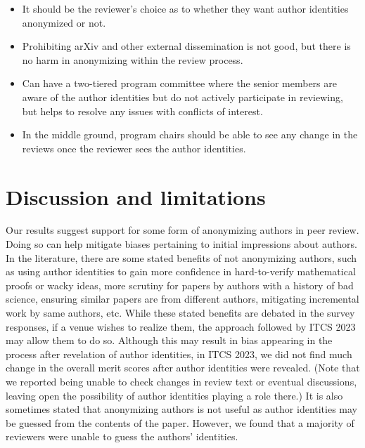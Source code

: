 \documentclass{article}
\begin{document}
{\begin{itemize}
\begin{itemize}
    \item It should be the reviewer's choice as to whether they want author identities anonymized or not.
        
    \item Prohibiting arXiv and other external dissemination is not good, but there is no harm in anonymizing within the review process.

    \item Can have a two-tiered program committee where the senior members are aware of the author identities but do not actively participate in reviewing, but helps to resolve any issues with conflicts of interest.
        
    \item In the middle ground, program chairs should be able to see any change in the reviews once the reviewer sees the author identities.
\end{itemize}

\end{itemize}
}

\section{Discussion and limitations}
Our results suggest support for some form of anonymizing authors in peer review. Doing so can help mitigate biases pertaining to initial impressions about authors. In the literature, there are some stated benefits of not anonymizing authors, such as using author identities to gain more confidence in hard-to-verify mathematical proofs or wacky ideas, more scrutiny for papers by authors with a history of bad science, ensuring similar papers are from different authors, mitigating incremental work by same authors, etc. While these stated benefits are debated in the survey responses, if a venue wishes to realize them, the approach followed by ITCS 2023 may allow them to do so. Although this may result in bias appearing in the process after revelation of author identities, in ITCS 2023, we did not find much change in the overall merit scores after author identities were revealed. (Note that we reported being unable to check changes in review text or eventual discussions, leaving open the possibility of author identities playing a role there.) It is also sometimes stated that anonymizing authors is not useful as author identities may be guessed from the contents of the paper. However, we found that a majority of reviewers were unable to guess the authors' identities. 
\end{document}
